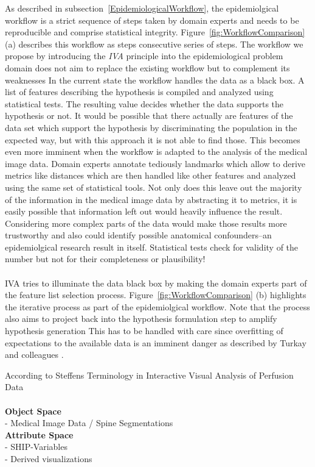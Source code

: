 \documentclass[journal]{style/vgtc}           %
\begin{document}
As described in subsection~\ref{EpidemiologicalWorkflow}, the epidemiolgical workflow is a strict sequence of steps taken by domain experts and needs to be reproducible and comprise statistical integrity.
%
Figure~\ref{fig:WorkflowComparison} (a) describes this workflow as steps consecutive series of steps.
%
The workflow we propose by introducing the \emph{IVA} principle into the epidemiological problem domain does not aim to replace the existing workflow but to complement its weaknesses 
%
In the current state the workflow handles the data as a black box.
%
A list of features describing the hypothesis is compiled and analyzed using statistical tests. 
%
The resulting value decides whether the data supports the hypothesis or not.
%
It would be possible that there actually are features of the data set which support the hypothesis by discriminating the population in the expected way, but with this approach it is not able to find those.
%
This becomes even more imminent when the workflow is adapted to the analysis of the medical image data.
%
Domain experts annotate tediously landmarks which allow to derive metrics like distances which are then handled like other features and analyzed using the same set of statistical tools.
%
Not only does this leave out the majority of the information in the medical image data by abstracting it to metrics, it is easily possible that information left out would heavily influence the result.
%
Considering more complex parts of the data would make those results more trustworthy and also could identify possible anatomical confounders--an epidemiolgical research result in itself.
%
Statistical tests check for validity of the number but not for their completeness or plausibility!
\\\\
IVA tries to illuminate the data black box by making the domain experts part of the feature list selection process.
%
Figure~\ref{fig:WorkflowComparison} (b) highlights the iterative process as part of the epidemiolgical workflow.
%
Note that the process also aims to project back into the hypothesis formulation step to amplify hypothesis generation 
%
This has to be handled with care since overfitting of expectations to the available data is an imminent danger as described by Turkay and colleagues \cite{Turkay2013}.

According to Steffens Terminology in Interactive Visual Analysis of Perfusion Data
\\\\
\textbf{Object Space}\\
- Medical Image Data / Spine Segmentations\\
\textbf{Attribute Space}\\
- SHIP-Variables\\
- Derived visualizations
\end{document}
